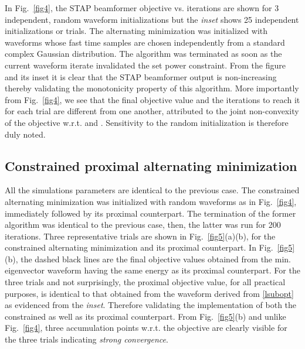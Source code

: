 \documentclass[11pt,draftclsnofoot,onecolumn]{IEEEtran}
\theoremstyle{definition}
\theoremstyle{remark}
\begin{document}
In Fig.~\ref{fig4}, the STAP beamformer objective vs. iterations are shown for 3 independent, random waveform initializations but the {\it inset} shows 25 independent initializations or trials. The alternating minimization was initialized with waveforms whose fast time samples are chosen independently from a standard complex Gaussian distribution. The algorithm was terminated as soon as the current waveform iterate invalidated the set power constraint. From the figure and its inset it is clear that the STAP beamformer output is non-increasing thereby validating the monotonicity property of this algorithm.  More importantly from Fig.~\ref{fig4}, we see that the final objective value and the iterations to reach it for each trial are different from one another, attributed to the joint non-convexity of the objective w.r.t.  and . Sensitivity to the random initialization is therefore duly noted.

\subsection{Constrained proximal alternating minimization}
All the simulations parameters are identical to the previous case. The constrained alternating minimization was initialized with random waveforms as in Fig.~\ref{fig4}, immediately followed by its proximal counterpart. The termination of the former algorithm was identical to the previous case, then, the latter was run for 200 iterations. Three representative trials are shown in Fig.~\ref{fig5}(a)(b), for the constrained alternating minimization and its proximal counterpart. In Fig.~\ref{fig5}(b), the dashed black lines are the final objective values obtained from the min. eigenvector waveform having the same energy as its proximal counterpart. For the three trials and not surprisingly, the proximal objective value, for all practical purposes, is identical to that obtained from the waveform derived from \eqref{lsubopt} as evidenced from the {\it inset}. Therefore validating the implementation of both the constrained as well as its proximal counterpart. From Fig.~\ref{fig5}(b) and unlike Fig.~\ref{fig4}, three accumulation points w.r.t. the objective are clearly visible for the three trials indicating {\it strong convergence}. 
\end{document}
